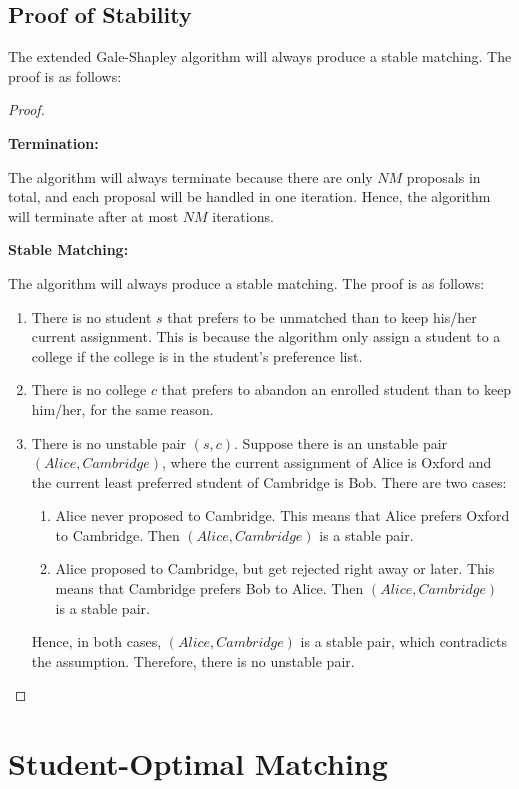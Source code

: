 \documentclass[a4paper,12pt]{article}
\begin{document}
\subsection*{Proof of Stability}

The extended Gale-Shapley algorithm will always produce a stable matching.
The proof is as follows:

\begin{proof}
$ $

\textbf{Termination:}

The algorithm will always terminate because there are only $NM$ proposals in total, and each proposal will be handled in one iteration.
Hence, the algorithm will terminate after at most $NM$ iterations.

\textbf{Stable Matching:}

The algorithm will always produce a stable matching.
The proof is as follows:
\begin{enumerate}
	\item There is no student $s$ that prefers to be unmatched than to keep his/her current assignment.
		This is because the algorithm only assign a student to a college if the college is in the student's preference list.
	\item There is no college $c$ that prefers to abandon an enrolled student than to keep him/her, for the same reason.
	\item There is no unstable pair $(s, c)$.
		Suppose there is an unstable pair $(Alice, Cambridge)$, where the current assignment of Alice is Oxford and the current least preferred student of Cambridge is Bob.
		There are two cases:
		\begin{enumerate}
			\item Alice never proposed to Cambridge.
				This means that Alice prefers Oxford to Cambridge.
				Then $(Alice, Cambridge)$ is a stable pair.
			\item Alice proposed to Cambridge, but get rejected right away or later.
				This means that Cambridge prefers Bob to Alice.
				Then $(Alice, Cambridge)$ is a stable pair.
		\end{enumerate}
		Hence, in both cases, $(Alice, Cambridge)$ is a stable pair, which contradicts the assumption.
		Therefore, there is no unstable pair.
\end{enumerate}
\end{proof}

\section*{Student-Optimal Matching}
\end{document}
